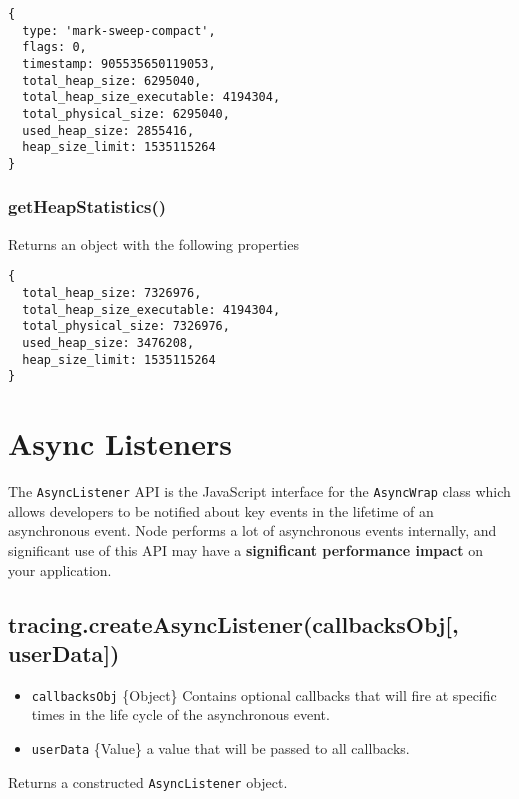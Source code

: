 \begin{verbatim}
{
  type: 'mark-sweep-compact',
  flags: 0,
  timestamp: 905535650119053,
  total_heap_size: 6295040,
  total_heap_size_executable: 4194304,
  total_physical_size: 6295040,
  used_heap_size: 2855416,
  heap_size_limit: 1535115264
}
\end{verbatim}

\subsubsection{getHeapStatistics()}\label{getheapstatistics}

Returns an object with the following properties

\begin{verbatim}
{
  total_heap_size: 7326976,
  total_heap_size_executable: 4194304,
  total_physical_size: 7326976,
  used_heap_size: 3476208,
  heap_size_limit: 1535115264
}
\end{verbatim}

\section{Async Listeners}\label{async-listeners}

The \texttt{AsyncListener} API is the JavaScript interface for the
\texttt{AsyncWrap} class which allows developers to be notified about
key events in the lifetime of an asynchronous event. Node performs a lot
of asynchronous events internally, and significant use of this API may
have a \textbf{significant performance impact} on your application.

\subsection{tracing.createAsyncListener(callbacksObj{[},
userData{]})}\label{tracing.createasynclistenercallbacksobj-userdata}

\begin{itemize}
\itemsep1pt\parskip0pt
\item
  \texttt{callbacksObj} \{Object\} Contains optional callbacks that will
  fire at specific times in the life cycle of the asynchronous event.
\item
  \texttt{userData} \{Value\} a value that will be passed to all
  callbacks.
\end{itemize}

Returns a constructed \texttt{AsyncListener} object.

